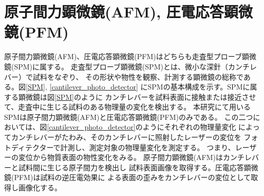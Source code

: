 \documentclass[dvipdfmx,12pt,a4paper]{jreport}
\begin{document}
			\section{原子間力顕微鏡(AFM), 圧電応答顕微鏡(PFM)}
			原子間力顕微鏡(AFM)、圧電応答顕微鏡(PFM)はどちらも走査型プローブ顕微鏡(SPM)に属する。
			走査型プローブ顕微鏡(SPM)とは、微小な深針（カンチレバー）で試料をなぞり、
			その形状や物性を観察、計測する顕微鏡の総称である。図\ref{SPM}, \ref{cantilever_photo_detector}
			にSPMの基本構成を示す。SPMに属する顕微鏡は図\ref{SPM}のように
			カンチレバーを試料表面に接触または接近させて、走査中に生じる試料のある物理量の変化を検出する。
			本研究にて用いるSPMは原子間力顕微鏡(AFM)と圧電応答顕微鏡(PFM)のみである。
			この二つにおいては、図\ref{cantilever_photo_detector}のようにそれぞれの物理量変化
			によってカンチレバーがたわみ、そのカンチレバーに照射したレーザーの変位を
			フォトディテクターで計測し、測定対象の物理量変化を測定する。
			つまり、レーザーの変位から物質表面の物性変化をみる。
			原子間力顕微鏡(AFM)はカンチレバーと試料間に生じる原子間力を検出し
			試料表面画像を取得する。圧電応答顕微鏡(PFM)は試料の逆圧電効果に
			よる表面の歪みをカンチレバーの変位として取得し画像化する。
\end{document}

